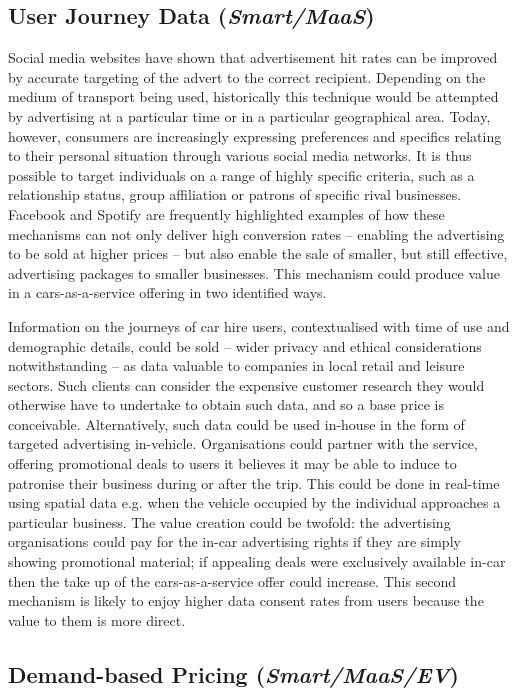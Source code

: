 \documentclass[b5paper,10pt]{article}
\begin{document}
\subsection{User Journey Data ({\emph{Smart/MaaS}})}

Social media websites have shown that advertisement hit rates can be
improved by accurate targeting of the advert to the correct
recipient. Depending on the medium of transport being used,
historically this technique would be attempted by advertising at a
particular time or in a particular geographical area. Today, however,
consumers are increasingly expressing preferences and specifics
relating to their personal situation through various social media
networks. It is thus possible to target individuals on a range of
highly specific criteria, such as a relationship status, group
affiliation or patrons of specific rival businesses.  Facebook and
Spotify are frequently highlighted examples of how these mechanisms
can not only deliver high conversion rates -- enabling the advertising
to be sold at higher prices -- but also enable the sale of smaller,
but still effective, advertising packages to smaller businesses. This
mechanism could produce value in a cars-as-a-service offering in two
identified ways.

Information on the journeys of car hire users, contextualised with
time of use and demographic details, could be sold -- wider privacy
and ethical considerations notwithstanding -- as data valuable to
companies in local retail and leisure sectors. Such clients can
consider the expensive customer research they would otherwise have to
undertake to obtain such data, and so a base price is conceivable.
Alternatively, such data could be used in-house in the form of
targeted advertising in-vehicle. Organisations could partner with the
service, offering promotional deals to users it believes it may be
able to induce to patronise their business during or after the
trip. This could be done in real-time using spatial data e.g. when the
vehicle occupied by the individual approaches a particular
business. The value creation could be twofold: the advertising
organisations could pay for the in-car advertising rights if they are
simply showing promotional material; if appealing deals were
exclusively available in-car then the take up of the cars-as-a-service
offer could increase. This second mechanism is likely to enjoy higher
data consent rates from users because the value to them is more
direct.


\subsection{Demand-based Pricing ({\emph{Smart/MaaS/EV}})}
\end{document}
